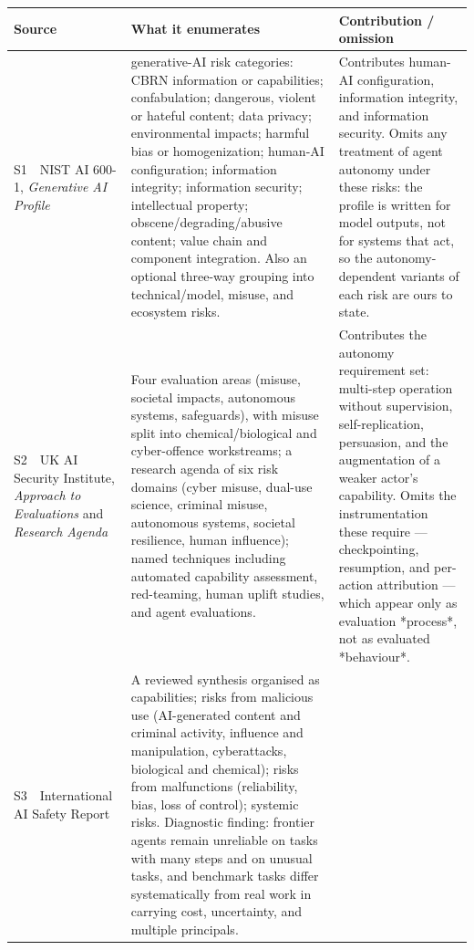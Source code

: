 \begin{table}[h]
\centering
\footnotesize
\begin{tabular}{@{}>{\raggedright\arraybackslash}p{}>{\raggedright\arraybackslash}p{}>{\raggedright\arraybackslash}p{}@{}}
\toprule
\textbf{Source} & \textbf{What it enumerates} & \textbf{Contribution / omission} \\
\midrule
S1~~NIST AI 600-1, \emph{Generative AI Profile}~\citep{nist-genai-profile}
& 12 generative-AI risk categories: CBRN information or capabilities; confabulation; dangerous, violent or hateful content; data privacy; environmental impacts; harmful bias or homogenization; human-AI configuration; information integrity; information security; intellectual property; obscene/degrading/abusive content; value chain and component integration. Also an optional three-way grouping into technical/model, misuse, and ecosystem risks.
& Contributes human-AI configuration, information integrity, and information security. Omits any treatment of agent autonomy under these risks: the profile is written for model outputs, not for systems that act, so the autonomy-dependent variants of each risk are ours to state. \\
S2~~UK AI Security Institute, \emph{Approach to Evaluations} and \emph{Research Agenda}~\citep{uk-aisi-approach-evaluations}
& Four evaluation areas (misuse, societal impacts, autonomous systems, safeguards), with misuse split into chemical/biological and cyber-offence workstreams; a research agenda of six risk domains (cyber misuse, dual-use science, criminal misuse, autonomous systems, societal resilience, human influence); named techniques including automated capability assessment, red-teaming, human uplift studies, and agent evaluations.
& Contributes the autonomy requirement set: multi-step operation without supervision, self-replication, persuasion, and the augmentation of a weaker actor's capability. Omits the instrumentation these require --- checkpointing, resumption, and per-action attribution --- which appear only as evaluation *process*, not as evaluated *behaviour*. \\
S3~~International AI Safety Report~\citep{iasr2025}
& A reviewed synthesis organised as capabilities; risks from malicious use (AI-generated content and criminal activity, influence and manipulation, cyberattacks, biological and chemical); risks from malfunctions (reliability, bias, loss of control); systemic risks. Diagnostic finding: frontier agents remain unreliable on tasks with many steps and on unusual tasks, and benchmark tasks differ systematically from real work in carrying cost, uncertainty, and multiple principals.

\end{tabular}
\end{table}
